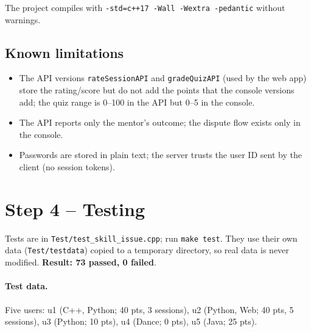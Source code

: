 \documentclass[11pt,a4paper]{article}
\begin{document}
The project compiles with \texttt{-std=c++17 -Wall -Wextra -pedantic} without warnings.

\subsection{Known limitations}

\begin{itemize}[nosep]
\item The API versions \texttt{rateSessionAPI} and \texttt{gradeQuizAPI} (used by the web app) store the rating/score but do not add the points that the console versions add; the quiz range is 0--100 in the API but 0--5 in the console.
\item The API reports only the mentor's outcome; the dispute flow exists only in the console.
\item Passwords are stored in plain text; the server trusts the user ID sent by the client (no session tokens).
\end{itemize}

\section{Step 4 -- Testing}

Tests are in \texttt{Test/test\_skill\_issue.cpp}; run \texttt{make test}. They use their own data (\texttt{Test/testdata}) copied to a temporary directory, so real data is never modified. \textbf{Result: 73 passed, 0 failed}.

\paragraph{Test data.} Five users: u1 (C++, Python; 40 pts, 3 sessions), u2 (Python, Web; 40 pts, 5 sessions), u3 (Python; 10 pts), u4 (Dance; 0 pts), u5 (Java; 25 pts).
\end{document}
